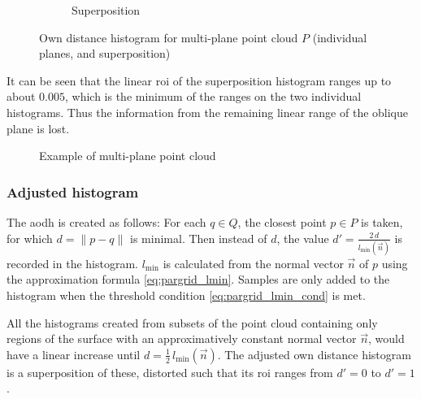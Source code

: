 \begin{figure}[H]
\begin{subfigure}{.32\textwidth}
	\caption{Superposition}
\end{subfigure}
\caption{Own distance histogram for multi-plane point cloud $P$ (individual planes, and superposition)}
\label{fig:multiplane_cphist}
\end{figure}

It can be seen that the linear \gls{roi} of the superposition histogram ranges up to about $0.005$, which is the minimum of the ranges on the two individual histograms. Thus the information from the remaining linear range of the oblique plane is lost.

\begin{figure}[p]
\centering
{
	\setlength{\fboxsep}{0pt}%
	\setlength{\fboxrule}{0.5pt}%
}
\caption{Example of multi-plane point cloud}
\label{fig:disks1}
\end{figure}

\subsubsection{Adjusted histogram}
The \gls{aodh} is created as follows: For each $q \in Q$, the closest point $p \in P$ is taken, for which $d = \|p - q\|$ is minimal. Then instead of $d$, the value $d' = \frac{2 \, d}{l_{\text{min}}(\vec{n})}$ is recorded in the histogram. $l_{\text{min}}$ is calculated from the normal vector $\vec{n}$ of $p$ using the approximation formula \ref{eq:pargrid_lmin}. Samples are only added to the histogram when the threshold condition \ref{eq:pargrid_lmin_cond} is met.

All the histograms created from subsets of the point cloud containing only regions of the surface with an approximatively constant normal vector $\vec{n}$, would have a linear increase until $d = \frac{1}{2} \, l_{\text{min}}(\vec{n})$. The adjusted own distance histogram is a superposition of these, distorted such that its \gls{roi} ranges from $d' = 0$ to $d' = 1$.

